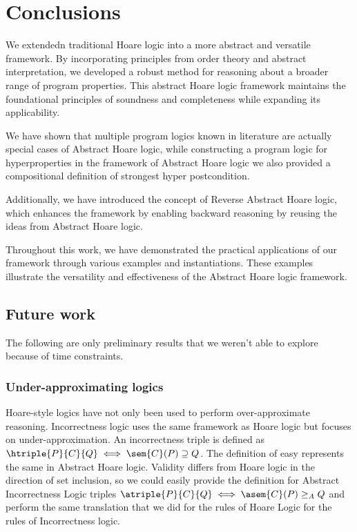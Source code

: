 \chapter{Conclusions}

We extendedn traditional Hoare logic into a more abstract and versatile 
framework. By incorporating principles from order theory and abstract 
interpretation, we developed a robust method for reasoning about a broader range 
of program properties. This abstract Hoare logic framework maintains the 
foundational principles of soundness and completeness while expanding its 
applicability.

We have shown that multiple program logics known in literature are actually 
special cases of Abstract Hoare logic, while constructing a program logic for 
hyperproperties in the framework of Abstract Hoare logic we also provided a 
compositional definition of strongest hyper postcondition.


Additionally, we have introduced the concept of Reverse Abstract Hoare logic, 
which enhances the framework by enabling backward reasoning by reusing the ideas
from Abstract Hoare logic. 

Throughout this work, we have demonstrated the practical applications of our 
framework through various examples and instantiations. These examples illustrate 
the versatility and effectiveness of the Abstract Hoare logic framework.

\section{Future work}
The following are only preliminary results that we weren't able to explore
because of time constraints.

\subsection{Under-approximating logics}
Hoare-style logics have not only been used to perform over-approximate
reasoning. Incorrectness logic \cite{OHearn19} uses the same framework as Hoare
logic but focuses on under-approximation. An incorrectness triple is defined as
$\htriple{P}{C}{Q} \iff \sem{C}(P) \supseteq Q$. The definition of easy
represents the same in Abstract Hoare logic. Validity differs from Hoare logic
in the direction of set inclusion, so we could easily provide the definition
for Abstract Incorrectness Logic triples $\atriple{P}{C}{Q} \iff \asem{C}(P)
\geq_A Q$ and perform the same translation that we did for the rules of Hoare
Logic for the rules of Incorrectness logic.

